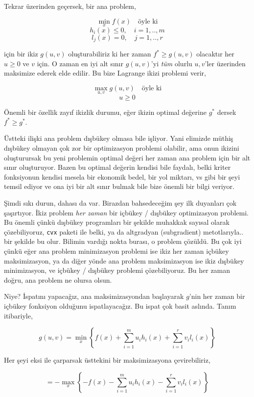 \documentclass[12pt,fleqn]{article}\usepackage{../../common}
\begin{document}
Tekrar üzerinden geçersek, bir ana problem,

$$
\min_x f(x) \quad \textrm{öyle ki}
$$
$$
h_i(x) \le 0, \quad i=1,..,m
$$
$$
l_j(x) = 0, \quad j=1,..,r
$$

için bir ikiz $g(u,v)$ oluşturabiliriz ki her zaman $f^\ast \ge g(u,v)$
olacaktır her $u \ge 0$ ve $v$ için. O zaman en iyi alt sınır $g(u,v)$'yi
{\em tüm} olurlu $u,v$'ler üzerinden maksimize ederek elde edilir. Bu bize
Lagrange ikizi problemi verir,

$$
\max_{u,v} g(u,v) \quad \textrm{öyle ki}
$$
$$
u \ge 0
$$

Önemli bir özellik zayıf ikizlik durumu, eğer ikizin optimal değerine $g^\ast$
dersek $f^\ast \ge g^\ast$.

Üstteki ilişki ana problem dışbükey olmasa bile işliyor. Yani elimizde
müthiş dışbükey olmayan çok zor bir optimizasyon problemi olabilir, ama
onun ikizini oluşturursak bu yeni problemin optimal değeri her zaman ana
problem için bir alt sınır oluşturuyor. Bazen bu optimal değerin kendisi
bile faydalı, belki kriter fonksiyonun kendisi mesela bir ekonomik bedel,
bir yol miktarı, vs gibi bir şeyi temsil ediyor ve ona iyi bir alt sınır
bulmak bile bize önemli bir bilgi veriyor.

Şimdi sıkı durun, dahası da var. Birazdan bahsedeceğim şey ilk duyanları
çok şaşırtıyor. İkiz problem {\em her zaman} bir içbükey / dışbükey
optimizasyon problemi. Bu önemli çünkü dışbükey programları bir şekilde
muhakkak sayısal olarak çözebiliyoruz, \verb!cvx! paketi ile belki, ya da
altgradyan (subgradient) metotlarıyla.. bir şekilde bu olur. Bilimin
vardığı nokta burası, o problem çözüldü. Bu çok iyi çünkü eğer ana problem
minimizasyon problemi ise ikiz her zaman içbükey maksimizasyon, ya da diğer
yönde ana problem maksimizasyon ise ikiz dışbükey minimizasyon, ve içbükey
/ dışbükey problemi çözebiliyoruz. Bu her zaman doğru, ana problem ne
olursa olsun.

Niye? İspatını yapacağız, ana maksimizasyondan başlayarak $g$'nin her zaman
bir içbükey fonksiyon olduğunu ispatlayacağız. Bu ispat çok basit
aslında. Tanım itibariyle,

$$
g(u,v) = \min_x \left\{ 
f(x) + \sum_{i=1}^{m} u_i h_i(x) + \sum_{i=1}^{r} v_i l_i(x) 
\right\}
$$

Her şeyi eksi ile çarparsak üsttekini bir maksimizasyona çevirebiliriz,

$$
= -\max_x \left\{ 
-f(x) - \sum_{i=1}^{m} u_i h_i(x) - \sum_{i=1}^{r} v_i l_i(x) 
\right\}
$$
\end{document}

